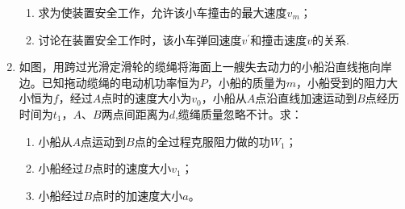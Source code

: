 \begin{enumerate}[leftmargin=0em]
\begin{enumerate}
\item 
求为使装置安全工作，允许该小车撞击的最大速度$ v_m $； 


\item 
讨论在装置安全工作时，该小车弹回速度$ v ^{\prime} $和撞击速度$ v $的关系. 



\end{enumerate}
\begin{figure}[h!]
\flushright

\end{figure}





\newpage
\item
{}
如图，用跨过光滑定滑轮的缆绳将海面上一艘失去动力的小船沿直线拖向岸边。已知拖动缆绳的电动机功率恒为$ P $，小船的质量为$ m $，小船受到的阻力大小恒为$ f $，经过$ A $点时的速度大小为$ v_{0} $，小船从$ A $点沿直线加速运动到$ B $点经历时间为$ t_{1} $，$ A $、$ B $两点间距离为$ d $,缆绳质量忽略不计。求：
\begin{enumerate}
\renewcommand{\labelenumi}{\arabic{enumi}.}
\item
小船从$ A $点运动到$ B $点的全过程克服阻力做的功$ W_{1} $；
\item 
小船经过$ B $点时的速度大小$ v_{1} $；
\item 
小船经过$ B $点时的加速度大小$ a $。




\end{enumerate}
\end{enumerate}
